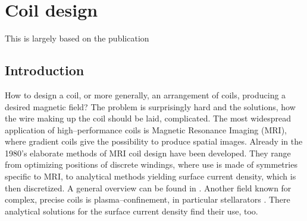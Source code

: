 \chapter{Coil design} %
\label{ch:coil_design}

This is largely based on the publication 

\section{Introduction}
How to design a coil, or more generally, an arrangement of coils, producing a desired magnetic field? The problem is surprisingly hard and the solutions, how the wire making up the coil should be laid, complicated. The most widespread application of high--performance coils is Magnetic Resonance Imaging (MRI), where gradient coils give the possibility to produce spatial images. Already in the 1980's elaborate methods of MRI coil design have been developed. They range from optimizing positions of discrete windings, where use is made of symmetries specific to MRI, to analytical methods yielding surface current density, which is then discretized. A general overview can be found in \cite{Turner1993}. Another field known for complex, precise coils is plasma--confinement, in particular stellarators \cite{Beidler1990}. There analytical solutions for the surface current density find their use, too.


